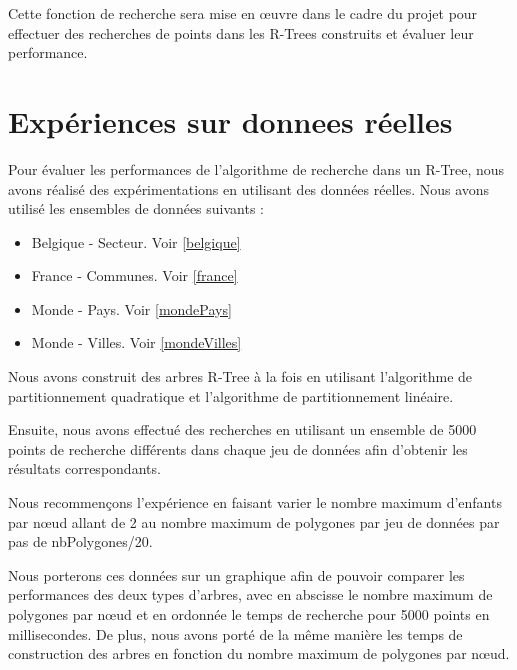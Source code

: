 \documentclass {article}
\begin{document}
Cette fonction de recherche sera mise en œuvre dans le cadre du projet pour effectuer des recherches
de points dans les R-Trees construits et évaluer leur performance.



\section {Expériences sur donnees réelles}


Pour évaluer les performances de l'algorithme de recherche dans un R-Tree,
nous avons réalisé des expérimentations en utilisant des données réelles.
Nous avons utilisé les ensembles de données suivants :

\begin{itemize}

    \item Belgique - Secteur. Voir \ref{belgique}
    \item France - Communes. Voir \ref{france}
    \item Monde - Pays. Voir \ref{mondePays}
    \item Monde - Villes. Voir \ref{mondeVilles}
\end{itemize}

Nous avons construit des arbres R-Tree à la fois en utilisant l'algorithme de partitionnement quadratique
et l'algorithme de partitionnement linéaire.

Ensuite, nous avons effectué des recherches en utilisant un ensemble de 5000 points de recherche différents
dans chaque jeu de données afin d'obtenir les résultats correspondants.

Nous recommençons l'expérience en faisant varier le nombre maximum d'enfants par nœud allant de 2 au nombre
maximum de polygones par jeu de données par pas de nbPolygones/20.

Nous porterons ces données sur un graphique afin de pouvoir comparer les performances des deux types d'arbres,
avec en abscisse le nombre maximum de polygones par nœud et en ordonnée le temps de recherche pour 5000 points
en millisecondes.
De plus, nous avons porté de la même manière les temps de construction des arbres en fonction du nombre maximum
de polygones par nœud.

\end{document}
